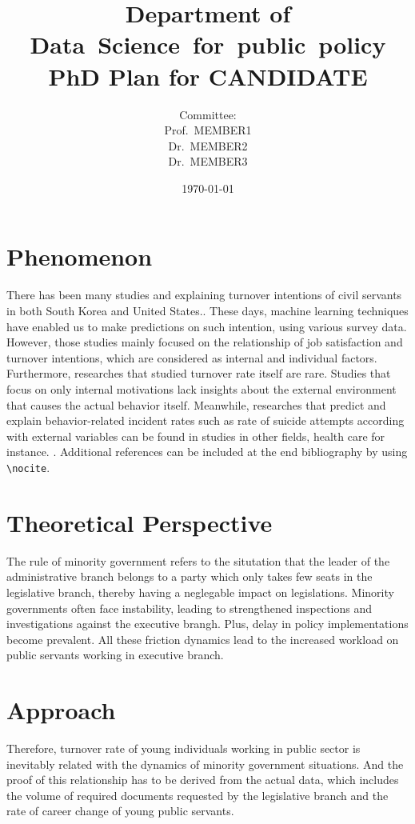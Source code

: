 \documentclass{tufte-handout}
\title[PhD Plan for CANDIDATE]{Department of \mbox{Data Science for public policy}\\PhD Plan for CANDIDATE}
\author[]{Committee:\\
Prof.~MEMBER1\\
Dr.~MEMBER2\\
Dr.~MEMBER3}
\date{\today}
\begin{document}
\maketitle%

\begin{marginfigure}[-5.2cm]
\end{marginfigure}

\section{Phenomenon}
There has been many studies and explaining turnover intentions of civil servants in both South Korea and United States.\cite{HenrichMcElreath:2003}. These days, machine learning techniques have enabled us to make predictions on such intention, using various survey data. However, those studies mainly focused on the relationship of job satisfaction and turnover intentions, which are considered as internal and individual factors. Furthermore, researches that studied turnover rate itself are rare. Studies that focus on only internal motivations lack insights about the external environment that causes the actual behavior itself. Meanwhile, researches that predict and explain behavior-related incident rates such as rate of suicide attempts according with external variables can be found in studies in other fields, health care for instance.
.\cite{HenrichMcElreath:2003} Additional references can be included at the end bibliography by using \verb|\nocite|. \nocite{NBGA2005}

\section{Theoretical Perspective}
The rule of minority government refers to the situtation that the leader of the administrative branch belongs to a party which only takes few seats in the legislative branch, thereby having a neglegable impact on legislations. Minority governments often face instability, leading to strengthened inspections and investigations against the executive brangh. Plus, delay in policy implementations become prevalent. All these friction dynamics lead to the increased workload on public servants working in executive branch.

\section{Approach}
Therefore, turnover rate of young individuals working in public sector is inevitably related with the dynamics of minority government situations. And the proof of this relationship has to be derived from the actual data,  which includes the volume of required documents requested by the legislative branch and the rate of career change of young public servants.
\end{document}
